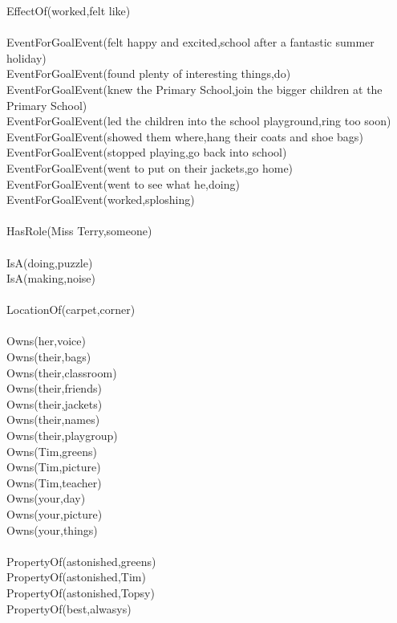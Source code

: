 \begin{multicols}{2}
\begin{footnotesize}
EffectOf(worked,felt like) \\
~\\
EventForGoalEvent(felt happy and excited,school after a fantastic summer holiday) \\
EventForGoalEvent(found plenty of interesting things,do) \\
EventForGoalEvent(knew the Primary School,join the bigger children at the Primary School) \\
EventForGoalEvent(led the children into the school playground,ring too soon) \\
EventForGoalEvent(showed them where,hang their coats and shoe bags) \\
EventForGoalEvent(stopped playing,go back into school) \\
EventForGoalEvent(went to put on their jackets,go home) \\
EventForGoalEvent(went to see what he,doing) \\
EventForGoalEvent(worked,sploshing) \\
~\\
HasRole(Miss Terry,someone) \\
~\\
IsA(doing,puzzle) \\
IsA(making,noise) \\
~\\
LocationOf(carpet,corner) \\
~\\
Owns(her,voice) \\
Owns(their,bags) \\
Owns(their,classroom) \\
Owns(their,friends) \\
Owns(their,jackets) \\
Owns(their,names) \\
Owns(their,playgroup) \\
Owns(Tim,greens) \\
Owns(Tim,picture) \\
Owns(Tim,teacher) \\
Owns(your,day) \\
Owns(your,picture) \\
Owns(your,things) \\
~\\
PropertyOf(astonished,greens) \\
PropertyOf(astonished,Tim) \\
PropertyOf(astonished,Topsy) \\
PropertyOf(best,alwasys) \\

\end{footnotesize}
\end{multicols}
